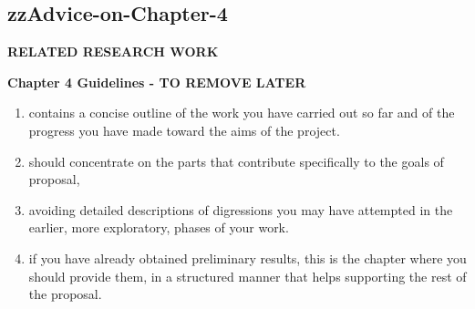 \pagebreak
\begin{tcolorbox}
	
\section{zzAdvice-on-Chapter-4}

\textbf{RELATED RESEARCH WORK}
\vspace*{1\baselineskip}

\textbf{Chapter 4 Guidelines - TO REMOVE LATER}	
\vspace*{1\baselineskip}

\begin{enumerate}
	
	\item contains a concise outline of the work you have carried out so far and of the progress you have made toward the aims of the project.
	
	\item should concentrate on the parts that contribute specifically to the goals of  proposal,
	
	\item avoiding detailed descriptions of digressions you may have attempted in the earlier, more exploratory, phases of your work.
	
	\item if you have already obtained preliminary results, this is the chapter where you should provide them, in a structured manner that helps supporting the rest of the proposal.
	

\end{enumerate}
	
\end{tcolorbox}

